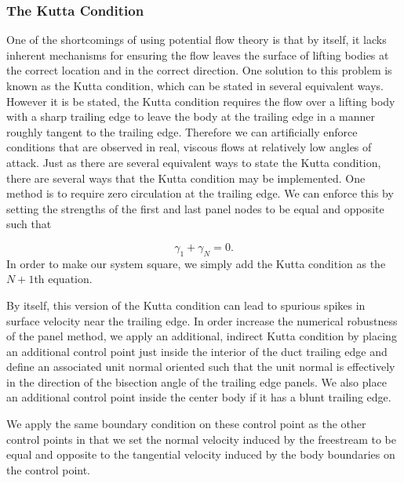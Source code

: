 \subsubsection{The Kutta Condition}

One of the shortcomings of using potential flow theory is that by itself, it lacks inherent mechanisms for ensuring the flow leaves the surface of lifting bodies at the correct location and in the correct direction.
%
One solution to this problem is known as the Kutta condition, which can be stated in several equivalent ways.
%
However it is be stated, the Kutta condition requires the flow over a lifting body with a sharp trailing edge to leave the body at the trailing edge in a manner roughly tangent to the trailing edge.
%
Therefore we can artificially enforce conditions that are observed in real, viscous flows at relatively low angles of attack.
%
Just as there are several equivalent ways to state the Kutta condition, there are several ways that the Kutta condition may be implemented.
%
One method is to require zero circulation at the trailing edge.
%
We can enforce this by setting the strengths of the first and last panel nodes to be equal and opposite such that

\begin{equation}
    \gamma_1 + \gamma_N = 0.
\end{equation}
%
In order to make our system square, we simply add the Kutta condition as the \(N+1\)th equation.

By itself, this version of the Kutta condition can lead to spurious spikes in surface velocity near the trailing edge.
%
In order increase the numerical robustness of the panel method, we apply an additional, indirect Kutta condition by placing an additional control point just inside the interior of the duct trailing edge and define an associated unit normal oriented such that the unit normal is effectively in the direction of the bisection angle of the trailing edge panels.
%
We also place an additional control point inside the center body if it has a blunt trailing edge.

 We apply the same boundary condition on these control point as the other control points in that we set the normal velocity induced by the freestream to be equal and opposite to the tangential velocity induced by the body boundaries on the control point.

